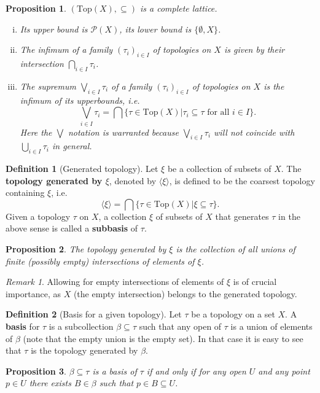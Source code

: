 \documentclass[a4paper,12pt,parskip=half*,chapterprefix=true,numbers=noendperiod]{scrreprt}
\newtheorem{proposition}{Proposition}[section]
\theoremstyle{definition}
\newtheorem{definition}{Definition}[section]
\theoremstyle{remark}
\newtheorem*{remark}{Remark}
\begin{document}
\begin{proposition}
	$(\text{Top}(X),\subseteq)$ is a complete lattice.
	\begin{enumerate}[(i)]
		\item Its upper bound is $\mathcal{P}(X)$, its lower bound is $\{\emptyset,X\}$.
		\item The infimum of a family $(\tau_i)_{i\in I}$ of topologies on $X$ is given by their intersection $\bigcap_{i\in I}\tau_i$.
		\item The supremum $\bigvee_{i\in I}\tau_i$ of a family $(\tau_i)_{i\in I}$ of topologies on $X$ is the infimum of its upperbounds, i.e.
		\begin{equation*}
			\bigvee_{i\in I}\tau_i=\bigcap\{\tau\in\text{Top}(X)|\tau_i\subseteq\tau\text{ for all }i\in I\}.
		\end{equation*}
		Here the $\bigvee$ notation is warranted because $\bigvee_{i\in I}\tau_i$ will \emph{not} coincide with $\bigcup_{i\in I}\tau_i$ in general.
	\end{enumerate}
\end{proposition}

\begin{definition}[Generated topology]
	Let $\xi$ be a collection of subsets of $X$. The \textbf{topology generated by $\xi$}, denoted by $\langle\xi\rangle$, is defined to be the coarsest topology containing $\xi$, i.e.
	\begin{equation*}
		\langle\xi\rangle=\bigcap\{\tau\in\text{Top}(X)|\xi\subseteq\tau\}.
	\end{equation*}
	Given a topology $\tau$ on $X$, a collection $\xi$ of subsets of $X$ that generates $\tau$ in the above sense is called a \textbf{subbasis} of $\tau$.
\end{definition}
\begin{proposition}
	The topology generated by $\xi$ is the collection of all unions of finite (possibly empty) intersections of elements of $\xi$.
\end{proposition}
\begin{remark}
	Allowing for empty intersections of elements of $\xi$ is of crucial importance, as $X$ (the empty intersection) belongs to the generated topology.
\end{remark}

\begin{definition}[Basis for a given topology]
	Let $\tau$ be a topology on a set $X$. A \textbf{basis} for $\tau$ is a subcollection $\beta\subseteq\tau$ such that any open of $\tau$ is a union of elements of $\beta$ (note that the empty union is the empty set). In that case it is easy to see that $\tau$ is the topology generated by $\beta$.
\end{definition}
\begin{proposition}
	$\beta\subseteq\tau$ is a basis of $\tau$ if and only if for any open $U$ and any point $p\in U$ there exists $B\in\beta$ such that $p\in B\subseteq U$.
\end{proposition}
\end{document}
